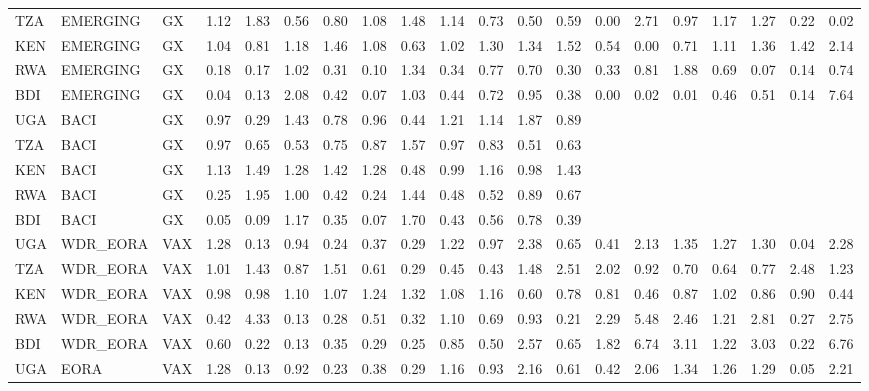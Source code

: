\documentclass[a4paper]{article}
\begin{document}
\begin{table}[ht]
{\begin{tabular}{lllrrrrrrrrrrrrrrrrr}
  TZA & EMERGING & GX & 1.12 & 1.83 & 0.56 & 0.80 & 1.08 & 1.48 & 1.14 & 0.73 & 0.50 & 0.59 & 0.00 & 2.71 & 0.97 & 1.17 & 1.27 & 0.22 & 0.02 \\ 
  KEN & EMERGING & GX & 1.04 & 0.81 & 1.18 & 1.46 & 1.08 & 0.63 & 1.02 & 1.30 & 1.34 & 1.52 & 0.54 & 0.00 & 0.71 & 1.11 & 1.36 & 1.42 & 2.14 \\ 
  RWA & EMERGING & GX & 0.18 & 0.17 & 1.02 & 0.31 & 0.10 & 1.34 & 0.34 & 0.77 & 0.70 & 0.30 & 0.33 & 0.81 & 1.88 & 0.69 & 0.07 & 0.14 & 0.74 \\ 
  BDI & EMERGING & GX & 0.04 & 0.13 & 2.08 & 0.42 & 0.07 & 1.03 & 0.44 & 0.72 & 0.95 & 0.38 & 0.00 & 0.02 & 0.01 & 0.46 & 0.51 & 0.14 & 7.64 \\ \midrule
  UGA & BACI & GX & 0.97 & 0.29 & 1.43 & 0.78 & 0.96 & 0.44 & 1.21 & 1.14 & 1.87 & 0.89 &  &  &  &  &  &  &  \\ 
  TZA & BACI & GX & 0.97 & 0.65 & 0.53 & 0.75 & 0.87 & 1.57 & 0.97 & 0.83 & 0.51 & 0.63 &  &  &  &  &  &  &  \\ 
  KEN & BACI & GX & 1.13 & 1.49 & 1.28 & 1.42 & 1.28 & 0.48 & 0.99 & 1.16 & 0.98 & 1.43 &  &  &  &  &  &  &  \\ 
  RWA & BACI & GX & 0.25 & 1.95 & 1.00 & 0.42 & 0.24 & 1.44 & 0.48 & 0.52 & 0.89 & 0.67 &  &  &  &  &  &  &  \\ 
  BDI & BACI & GX & 0.05 & 0.09 & 1.17 & 0.35 & 0.07 & 1.70 & 0.43 & 0.56 & 0.78 & 0.39 &  &  &  &  &  &  &  \\ \midrule
  UGA & WDR\_EORA & VAX & 1.28 & 0.13 & 0.94 & 0.24 & 0.37 & 0.29 & 1.22 & 0.97 & 2.38 & 0.65 & 0.41 & 2.13 & 1.35 & 1.27 & 1.30 & 0.04 & 2.28 \\ 
  TZA & WDR\_EORA & VAX & 1.01 & 1.43 & 0.87 & 1.51 & 0.61 & 0.29 & 0.45 & 0.43 & 1.48 & 2.51 & 2.02 & 0.92 & 0.70 & 0.64 & 0.77 & 2.48 & 1.23 \\ 
  KEN & WDR\_EORA & VAX & 0.98 & 0.98 & 1.10 & 1.07 & 1.24 & 1.32 & 1.08 & 1.16 & 0.60 & 0.78 & 0.81 & 0.46 & 0.87 & 1.02 & 0.86 & 0.90 & 0.44 \\ 
  RWA & WDR\_EORA & VAX & 0.42 & 4.33 & 0.13 & 0.28 & 0.51 & 0.32 & 1.10 & 0.69 & 0.93 & 0.21 & 2.29 & 5.48 & 2.46 & 1.21 & 2.81 & 0.27 & 2.75 \\ 
  BDI & WDR\_EORA & VAX & 0.60 & 0.22 & 0.13 & 0.35 & 0.29 & 0.25 & 0.85 & 0.50 & 2.57 & 0.65 & 1.82 & 6.74 & 3.11 & 1.22 & 3.03 & 0.22 & 6.76 \\ \midrule
  UGA & EORA & VAX & 1.28 & 0.13 & 0.92 & 0.23 & 0.38 & 0.29 & 1.16 & 0.93 & 2.16 & 0.61 & 0.42 & 2.06 & 1.34 & 1.26 & 1.29 & 0.05 & 2.21 \\ 

\end{tabular}}
\end{table}
\end{document}
